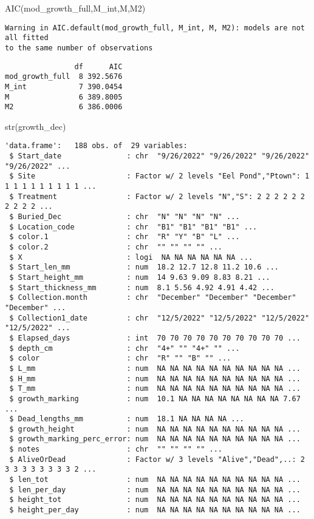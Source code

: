 \documentclass[
  letterpaper,
  DIV=11,
  numbers=noendperiod]{scrartcl}
\newenvironment{Shaded}{\begin{snugshade}}{\end{snugshade}}
\newcommand{\FunctionTok}[1]{\textcolor[rgb]{0.28,0.35,0.67}{#1}}
\newcommand{\NormalTok}[1]{\textcolor[rgb]{0.00,0.23,0.31}{#1}}
\begin{document}
\begin{Shaded}
\begin{Highlighting}[]
\FunctionTok{AIC}\NormalTok{(mod\_growth\_full,M\_int,M,M2)}
\end{Highlighting}
\end{Shaded}

\begin{verbatim}
Warning in AIC.default(mod_growth_full, M_int, M, M2): models are not all fitted
to the same number of observations
\end{verbatim}

\begin{verbatim}
                df      AIC
mod_growth_full  8 392.5676
M_int            7 390.0454
M                6 389.8005
M2               6 386.0006
\end{verbatim}

\begin{Shaded}
\begin{Highlighting}[]
\FunctionTok{str}\NormalTok{(growth\_dec)}
\end{Highlighting}
\end{Shaded}

\begin{verbatim}
'data.frame':   188 obs. of  29 variables:
 $ Start_date               : chr  "9/26/2022" "9/26/2022" "9/26/2022" "9/26/2022" ...
 $ Site                     : Factor w/ 2 levels "Eel Pond","Ptown": 1 1 1 1 1 1 1 1 1 1 ...
 $ Treatment                : Factor w/ 2 levels "N","S": 2 2 2 2 2 2 2 2 2 2 ...
 $ Buried_Dec               : chr  "N" "N" "N" "N" ...
 $ Location_code            : chr  "B1" "B1" "B1" "B1" ...
 $ color.1                  : chr  "R" "Y" "B" "L" ...
 $ color.2                  : chr  "" "" "" "" ...
 $ X                        : logi  NA NA NA NA NA NA ...
 $ Start_len_mm             : num  18.2 12.7 12.8 11.2 10.6 ...
 $ Start_height_mm          : num  14 9.63 9.09 8.83 8.21 ...
 $ Start_thickness_mm       : num  8.1 5.56 4.92 4.91 4.42 ...
 $ Collection.month         : chr  "December" "December" "December" "December" ...
 $ Collection1_date         : chr  "12/5/2022" "12/5/2022" "12/5/2022" "12/5/2022" ...
 $ Elapsed_days             : int  70 70 70 70 70 70 70 70 70 70 ...
 $ depth_cm                 : chr  "4+" "" "4+" "" ...
 $ color                    : chr  "R" "" "B" "" ...
 $ L_mm                     : num  NA NA NA NA NA NA NA NA NA NA ...
 $ H_mm                     : num  NA NA NA NA NA NA NA NA NA NA ...
 $ T_mm                     : num  NA NA NA NA NA NA NA NA NA NA ...
 $ growth_marking           : num  10.1 NA NA NA NA NA NA NA NA 7.67 ...
 $ Dead_lengths_mm          : num  18.1 NA NA NA NA ...
 $ growth_height            : num  NA NA NA NA NA NA NA NA NA NA ...
 $ growth_marking_perc_error: num  NA NA NA NA NA NA NA NA NA NA ...
 $ notes                    : chr  "" "" "" "" ...
 $ AliveOrDead              : Factor w/ 3 levels "Alive","Dead",..: 2 3 3 3 3 3 3 3 3 2 ...
 $ len_tot                  : num  NA NA NA NA NA NA NA NA NA NA ...
 $ len_per_day              : num  NA NA NA NA NA NA NA NA NA NA ...
 $ height_tot               : num  NA NA NA NA NA NA NA NA NA NA ...
 $ height_per_day           : num  NA NA NA NA NA NA NA NA NA NA ...
\end{verbatim}
\end{document}
